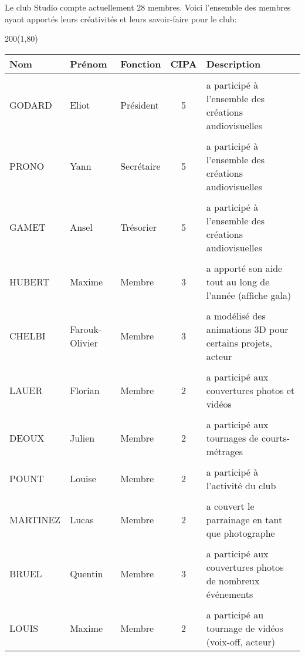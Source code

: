 Le club Studio compte actuellement 28 membres. Voici l'ensemble des membres ayant apportés leurs créativités et leurs savoir-faire pour le club:

\begin{textblock}{200}(1,80)
\begin{table}
	\small
	\begin{tabular}{|l|l|l|c|l|}
		\hline
			\textbf{Nom} & \textbf{Prénom} & \textbf{Fonction} & \textbf{CIPA} & \textbf{Description}\\
		\hline
			& & & & \\
			GODARD 		& Eliot 	& Président 	& 5  	& a participé à l'ensemble des créations audiovisuelles\\
			& & & & \\
			PRONO 		& Yann 		& Secrétaire	& 5		& a participé à l'ensemble des créations audiovisuelles\\
			& & & & \\
			GAMET 		& Ansel 	& Trésorier 	& 5		& a participé à l'ensemble des créations audiovisuelles\\
			& & & & \\
			HUBERT 		& Maxime 	& Membre 		& 3		& a apporté son aide tout au long de l'année (affiche gala)\\
			& & & & \\
			CHELBI 		& Farouk-Olivier & Membre 	& 3		& a modélisé des animations 3D pour certains projets, acteur\\
			& & & & \\
			LAUER 		& Florian 	& Membre 		& 2		& a participé aux couvertures photos et vidéos\\
			& & & & \\
			DEOUX 		& Julien 	& Membre 		& 2		& a participé aux tournages de courts-métrages\\
			& & & & \\
			POUNT 		& Louise 	& Membre 		& 2 	& a participé à l'activité du club\\
			& & & & \\
			MARTINEZ 	& Lucas 	& Membre 		& 2		& a couvert le parrainage en tant que photographe\\
			& & & & \\
			BRUEL 		& Quentin 	& Membre 		& 3		& a participé aux couvertures photos de nombreux événements\\
			& & & & \\
			LOUIS 		& Maxime 	& Membre 		& 2  	& a participé au tournage de vidéos (voix-off, acteur)\\

\end{tabular}
\end{table}
\end{textblock}
